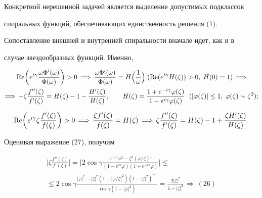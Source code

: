 Конкретной нерешенной задачей является выделение допустимых подклассов


спиральных функций, обеспечивающих единственность решения (1).





Сопоставление внешней и внутренней спиральности вначале идет, как и в


случае звездообразных функций. Именно,


\begin{multline}


\re\biggl(e^{i\gamma}\frac{\omega\Phi'(\omega)}{\Phi(\omega)}\biggr)


>0\,\Longrightarrow\,\frac{\omega\Phi'(\omega)}{\Phi(\omega)}=


H\Bigl(\frac{1}{\omega}\Bigr) \;


(\re(e^{i\gamma}H(\zeta))>0,\;H(0)=1)\,\Longrightarrow \\


%


\Longrightarrow\,-\zeta\frac{f''(\zeta)}{f'(\zeta)}=H(\zeta)-1-


\frac{H'(\zeta)}{H(\zeta)},


\qquad H(\zeta)=\frac{1+e^{-i\gamma}\varphi(\zeta)}


{1-e^{i\gamma}\varphi(\zeta)}\ \;(|\varphi(\zeta)|\le 1,\;


\varphi(\zeta)\sim\zeta^2);


\end{multline}


\begin{equation}


\re\biggl(e^{i\gamma}\zeta\frac{f'(\zeta)}{f(\zeta)}\biggr)


>0\,\Longrightarrow\,\frac{\zeta f'(\zeta)}{f(\zeta)}=


H(\zeta)\,\Longrightarrow\,\zeta\frac{f''(\zeta)}{f'(\zeta)}


=H(\zeta)-1+\frac{\zeta H'(\zeta)}{H(\zeta)}.


\end{equation}


Оценивая выражение (27), получим


\begin{gather*}


\biggl|\zeta\frac{f''(\zeta)}{f'(\zeta)}\biggr|=


\biggl|2\cos\gamma\frac{e^{-i\gamma}\varphi^2-\zeta^2(\varphi/\zeta)'}


{(1-e^{i\gamma}\varphi)(1+e^{-i\gamma}\varphi)}\biggr|\le \\


\le 2\cos\gamma


\frac{|\varphi|^2-|\zeta|^2(1-|\varphi/\zeta|^2)


(1-|\zeta|^2)^{-1}}{\cos\gamma(1-|\varphi|^2)}=


\frac{2|\zeta|^2}{1-|\zeta|^2}\,\Longrightarrow\,(26)


\end{gather*}


